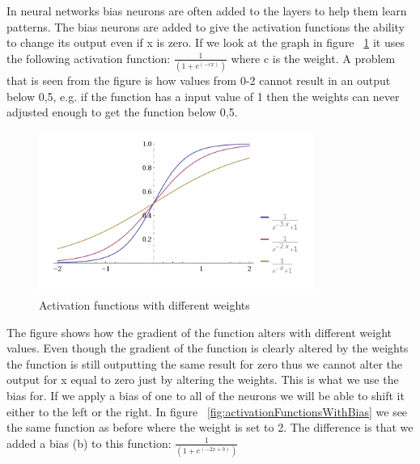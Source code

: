 In neural networks bias neurons are often added to the layers to help them learn patterns. The bias neurons are added to give the activation functions the ability to change its output even if x is zero. If we look at the graph in figure ~\ref{fig:activationFunctions} it uses the following activation function: \begin{math} \frac{1}{(1+e^{(-cx)})} \end{math} where c is the weight. A problem that is seen from the figure is how values from 0-2 cannot result in an output below 0,5, e.g. if the function has a input value of 1 then the weights can never adjusted enough to get the function below 0,5.

\begin{figure}[!ht]
\centering
\includegraphics[width=0.8\textwidth ,natwidth=410,natheight=237]{billeder/ActivationFunctions.png}
\caption{Activation functions with different weights}
\label{fig:activationFunctions}
\end{figure}

The figure shows how the gradient of the function alters with different weight values. Even though the gradient of the function is clearly altered by the weights the function is still outputting the same result for zero thus we cannot alter the output for x equal to zero just by altering the weights. This is what we use the bias for. If we apply a bias of one to all of the neurons we will be able to shift it either to the left or the right. In figure ~\ref{fig:activationFunctionsWithBias} we see the same function as before where the weight is set to 2. The difference is that we added a bias (b) to this function: \begin{math} \frac{1}{(1+e^{(-2x+b)})} \end{math} \cite[p. 165]{rojas1996neural,inductiveBias}

